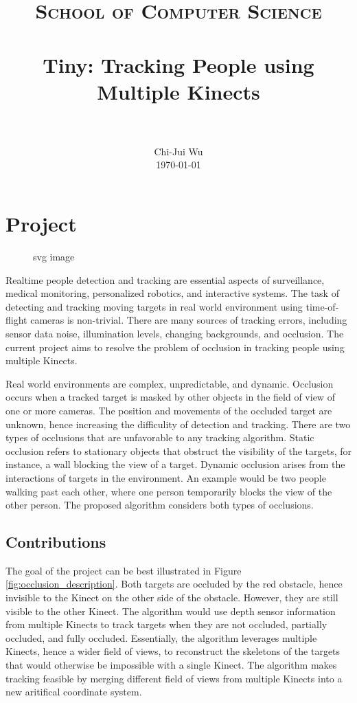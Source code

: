 \documentclass[paper=a4, fontsize=11pt]{scrartcl}
\title{
		\vspace{-3ex}
		\usefont{OT1}{bch}{b}{n}
		\normalfont \normalsize \textsc{School of Computer Science} \\ [25pt]
		\horrule{0.5pt} \\[0.4cm]
		\huge Tiny: Tracking People using Multiple Kinects \\
		\horrule{2pt} \\[0.5cm]
		\vspace{-2ex}
}
\author{
		\normalfont 								\normalsize
        Chi-Jui Wu\\[-3pt]		\normalsize
        \today
}
\date{}
\numberwithin{equation}{section}		%
\numberwithin{figure}{section}			%
\numberwithin{table}{section}				%
\begin{document}
\maketitle

\section{Project}
\begin{figure}[htbp]
  \centering
  
  \caption{svg image}
\end{figure}

Realtime people detection and tracking are essential aspects of surveillance, medical monitoring, personalized robotics, and interactive systems. The task of detecting and tracking moving targets in real world environment using time-of-flight cameras is non-trivial. There are many sources of tracking errors, including sensor data noise, illumination levels, changing backgrounds, and occlusion. The current project aims to resolve the problem of occlusion in tracking people using multiple Kinects.

Real world environments are complex, unpredictable, and dynamic. Occlusion occurs when a tracked target is masked by other objects in the field of view of one or more cameras. The position and movements of the occluded target are unknown, hence increasing the difficulity of detection and tracking. There are two types of occlusions that are unfavorable to any tracking algorithm. Static occlusion refers to stationary objects that obstruct the visibility of the targets, for instance, a wall blocking the view of a target. Dynamic occlusion arises from the interactions of targets in the environment. An example would be two people walking past each other, where one person temporarily blocks the view of the other person. The proposed algorithm considers both types of occlusions.

\subsection{Contributions}

The goal of the project can be best illustrated in Figure \ref{fig:occlusion_description}. Both targets are occluded by the red obstacle, hence invisible to the Kinect on the other side of the obstacle. However, they are still visible to the other Kinect. The algorithm would use depth sensor information from multiple Kinects to track targets when they are not occluded, partially occluded, and fully occluded. Essentially, the algorithm leverages multiple Kinects, hence a wider field of views, to reconstruct the skeletons of the targets that would otherwise be impossible with a single Kinect. The algorithm makes tracking feasible by merging different field of views from multiple Kinects into a new aritifical coordinate system.
\end{document}
